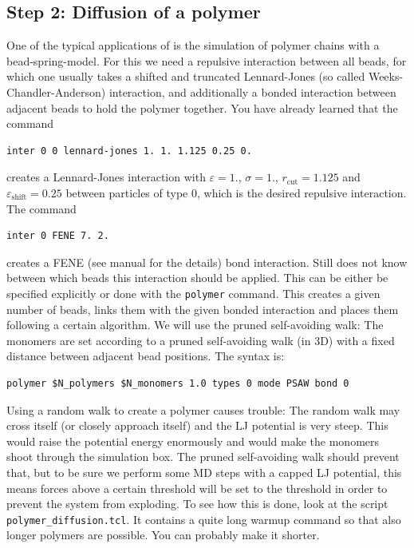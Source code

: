 \subsection{Step 2: Diffusion of a polymer}
One of the typical applications of \ES{} is the simulation of polymer chains 
with a bead-spring-model. For this we need a repulsive interaction
between all beads, for which one usually takes a shifted and truncated
Lennard-Jones (so called Weeks-Chandler-Anderson) interaction, 
and additionally a bonded interaction between 
adjacent beads to hold the polymer together. You have already learned
that the command
{\vspace{0,2cm}\small
\begin{lstlisting}[numbers=none]
inter 0 0 lennard-jones 1. 1. 1.125 0.25 0. 
\end{lstlisting}\vspace{0,2cm}
}
creates a Lennard-Jones interaction with $\varepsilon=1.$, $\sigma=1.$,
$r_\text{cut} = 1.125$ and $\varepsilon_\text{shift}=0.25$ between particles
of type 0, which is the desired 
repulsive interaction. The command
{\vspace{0,2cm}\small
\begin{lstlisting}[numbers=none]
inter 0 FENE 7. 2. 
\end{lstlisting}\vspace{0,2cm}
}
creates a FENE (see \ES{} manual for the details) bond interaction. Still \ES{}
does not know between which beads this interaction should be applied.
This can be either be specified explicitly or done with the \lstinline|polymer|
command. This creates a given number of beads, links them with the given
bonded interaction and places them following a certain algorithm. We will
use the pruned self-avoiding walk: The monomers are set according 
to a pruned self-avoiding walk (in 3D) with a
fixed distance between adjacent bead positions. The syntax is:
{\vspace{0,2cm}\small
\begin{lstlisting}[numbers=none]
polymer $N_polymers $N_monomers 1.0 types 0 mode PSAW bond 0 
\end{lstlisting}\vspace{0,2cm}
}
Using a random walk to create a polymer causes trouble: The random walk may 
cross itself (or closely approach itself) and the LJ potential is very
steep. This would raise the potential energy enormously and would make
the monomers shoot through the simulation box. The pruned self-avoiding
walk should prevent that, but to be sure
we perform some MD steps with a capped LJ potential, this means 
forces above a certain threshold will be set to the threshold in order to prevent
the system from exploding. To see how this is done, look at the script 
{\tt polymer\_diffusion.tcl}.
It contains a quite long warmup command so that also longer polymers
are possible. You can probably make it shorter.

